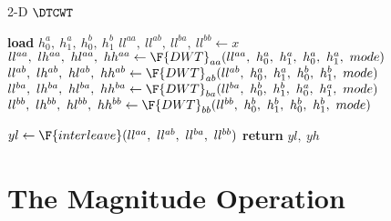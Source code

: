 \begin{algorithm}[tb]
\caption{2-D $\DTCWT$}\label{alg:ch3:dtcwt}
\begin{algorithmic}[1]
\State \textbf{load} $h_0^a,\ h_1^a,\ h_0^b,\ h_1^b$
\State $ll^{aa},\ ll^{ab},\ ll^{ba},\ ll^{bb} \gets x$
\State $ll^{aa},\ lh^{aa},\ hl^{aa},\ hh^{aa} \gets \F{DWT}_{aa}(ll^{aa},\ h_0^a,\ h_1^a,\ h_0^a,\ h_1^a,\ mode)$
\State $ll^{ab},\ lh^{ab},\ hl^{ab},\ hh^{ab} \gets \F{DWT}_{ab}(ll^{ab},\ h_0^a,\ h_1^a,\ h_0^b,\ h_1^b,\ mode)$
\State $ll^{ba},\ lh^{ba},\ hl^{ba},\ hh^{ba} \gets \F{DWT}_{ba}(ll^{ba},\ h_0^b,\ h_1^b,\ h_0^a,\ h_1^a,\ mode)$
\State $ll^{bb},\ lh^{bb},\ hl^{bb},\ hh^{bb} \gets \F{DWT}_{bb}(ll^{bb},\ h_0^b,\ h_1^b,\ h_0^b,\ h_1^b,\ mode)$
  \State {}
\EndFor
\State $yl \gets \F{interleave}(ll^{aa},\ ll^{ab},\ ll^{ba},\ ll^{bb})$
\State \textbf{return} $yl,\ yh$
\EndFunction
\end{algorithmic}\vspace{10pt}
\end{algorithm}

\section{The Magnitude Operation}\label{sec:ch3:mag}


